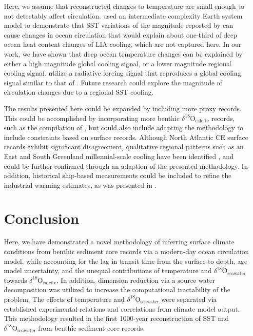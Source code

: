 \documentclass[draft]{agujournal2019}
\begin{document}
Here, we  assume that reconstructed changes to temperature are small enough to not
detectably affect circulation.
   used
an intermediate complexity Earth system model to demonstrate that SST
variations of the magnitude reported by  can cause
changes in ocean circulation that would explain about one-third of
deep ocean heat content changes of LIA cooling, which are not captured
here. In our work, we have shown that deep ocean temperature changes can
  be explained by either a high magnitude global cooling signal, or a lower magnitude
  regional cooling signal.  utilize a radiative forcing
  signal that reproduces a global cooling signal similar to that of \cite{gebbie19}.
  Future research could explore the magnitude of circulation changes due to a regional SST
  cooling. 

The results presented here could be expanded by including more proxy records. This could be accomplished by
incorporating more benthic $\delta^{18}\mathrm{O}_{\mathrm{calcite}}$
records, such as the compilation of ,
but could also include adapting the methodology to include constraints
based on surface records. Although North Atlantic CE surface records
exhibit significant disagreement, qualitative regional patterns such
as an East and South Greenland millennial-scale cooling have been
identified \cite[]{MoffaSanchez:Variability}, and could be further
confirmed through an adaption of the presented methodology. In
addition, historical ship-based measurements could be included to
refine the industrial warming estimates, as was presented in
.

\section{Conclusion}
Here, we have demonstrated a novel methodology of inferring surface
climate conditions from benthic sediment core records via a modern-day ocean
circulation model, while accounting for the lag in transit time from
the surface to depth, age model uncertainty, and the unequal
contributions of temperature and
$\delta^{18}\mathrm{O}_{\mathrm{seawater}}$ towards
$\delta^{18}\mathrm{O}_{\mathrm{calcite}}$. In addition, dimension
reduction via a source water decomposition was utilized to increase
the computational tractability of the problem. The effects of
temperature and $\delta^{18}\mathrm{O}_{\mathrm{seawater}}$ were separated
via established experimental relations and correlations from climate
model output. This methodology resulted in the first 1000-year
reconstruction of SST and
$\delta^{18}\mathrm{O}_{\mathrm{seawater}}$ from benthic sediment core
records.
\end{document}
